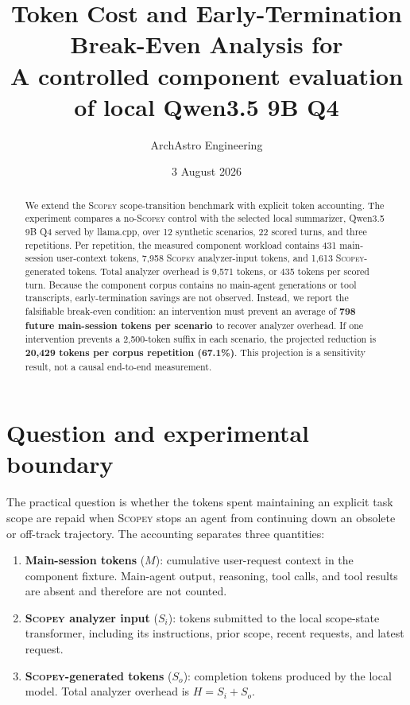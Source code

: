 \documentclass[10pt]{article}
\title{\vspace{-1.5em}\textbf{Token Cost and Early-Termination Break-Even Analysis for \scopey}\\
\large A controlled component evaluation of local Qwen3.5 9B Q4}
\author{ArchAstro Engineering}
\date{3 August 2026}
\newcommand{\scopey}{\textsc{Scopey}\xspace}
\newcommand{\result}[1]{\textcolor{scopeblue}{\textbf{#1}}}
\begin{document}
\maketitle

\begin{abstract}
We extend the \scopey scope-transition benchmark with explicit token accounting.
The experiment compares a no-\scopey control with the selected local summarizer,
Qwen3.5 9B Q4 served by llama.cpp, over 12 synthetic scenarios, 22 scored turns,
and three repetitions. Per repetition, the measured component workload contains
431 main-session user-context tokens, 7,958 \scopey analyzer-input tokens, and
1,613 \scopey-generated tokens. Total analyzer overhead is 9,571 tokens, or 435
tokens per scored turn. Because the component corpus contains no main-agent
generations or tool transcripts, early-termination savings are not observed.
Instead, we report the falsifiable break-even condition: an intervention must
prevent an average of \result{798 future main-session tokens per scenario} to
recover analyzer overhead. If one intervention prevents a 2,500-token suffix in
each scenario, the projected reduction is \result{20,429 tokens per corpus
repetition (67.1\%)}. This projection is a sensitivity result, not a causal
end-to-end measurement.
\end{abstract}

\section{Question and experimental boundary}

The practical question is whether the tokens spent maintaining an explicit
task scope are repaid when \scopey stops an agent from continuing down an
obsolete or off-track trajectory. The accounting separates three quantities:

\begin{enumerate}
  \item \textbf{Main-session tokens} ($M$): cumulative user-request context in
  the component fixture. Main-agent output, reasoning, tool calls, and tool
  results are absent and therefore are not counted.
  \item \textbf{\scopey analyzer input} ($S_i$): tokens submitted to the local
  scope-state transformer, including its instructions, prior scope, recent
  requests, and latest request.
  \item \textbf{\scopey-generated tokens} ($S_o$): completion tokens produced
  by the local model. Total analyzer overhead is $H=S_i+S_o$.
\end{enumerate}
\end{document}
